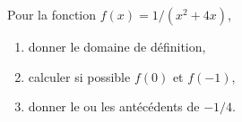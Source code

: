 
\begin{exercice}\label{exoPremiere-0018}

    Pour la fonction \( f(x)=1/(x^2+4x)\),
    \begin{enumerate}
        \item
            donner le domaine de définition,
        \item
            calculer si possible \( f(0)\) et \( f(-1)\),
        \item
            donner le ou les antécédents de \( -1/4\).
    \end{enumerate}

\end{exercice}
